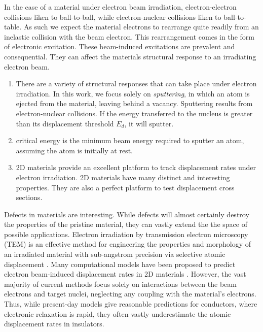 \documentclass{article}
\begin{document}
In the case of a material under electron beam irradiation, electron-electron collisions liken to ball-to-ball, while electron-nuclear collisions liken to ball-to-table.  As such
we expect the material electrons to rearrange quite readily from an inelastic collision with the beam electron.  This rearrangement comes in the form of electronic excitation.
These beam-induced excitations are prevalent and consequential.  They can affect the materials structural response to an irradiating electron beam.
\begin{enumerate}
\item
There are a variety of structural responses that can take place under electron irradiation.  In this work, we focus solely on \textit{sputtering}, in which an atom is ejected from the material, leaving behind a vacancy.  Sputtering results from electron-nuclear collisions.  If the energy transferred to the nucleus is greater than its displacement threshold $E_d$, it will sputter.
\item 
critical energy is the minimum beam energy required to sputter an atom, assuming the atom is initially at rest.
\item
2D materials provide an excellent platform to track displacement rates under electron irradiation.  2D materials have many distinct and interesting properties.
They are also a perfect platform to test displacement cross sections.
\end{enumerate}
Defects in materials are interesting.
While defects will almost certainly destroy the properties of the pristine material, they can vastly extend the the space of possible applications.
Electron irradiation by transmission electron microscopy (TEM) is an effective method for engineering the properties and morphology of an irradiated material with sub-angstrom precision via selective atomic displacement \cite{Zhao2017, Schleberger2018,Oxley2014,Kretschmer2018,Komsa2013}.
Many computational models have been proposed to predict electron beam-induced displacement rates in 2D materials  \cite{Meyer2012, Susi2016, Yoshimura2018, Susi2019}. However, the vast majority of current methods focus solely on interactions between the beam electrons and target nuclei, neglecting any coupling with the material’s electrons.  Thus, while present-day models give reasonable predictions for conductors, where electronic relaxation is rapid, they often vastly underestimate the atomic displacement rates in insulators.
\end{document}

